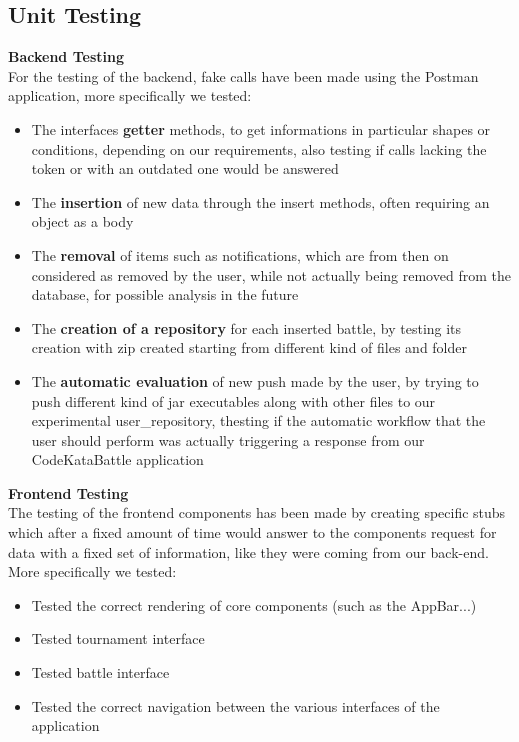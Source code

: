\documentclass[table, 12pt]{article}
\begin{document}
\subsection{Unit Testing}
\textbf{Backend Testing}\\
For the testing of the backend, fake calls have been made using the Postman application, more specifically we tested:
\begin{itemize}
    \item The interfaces \textbf{getter} methods, to get informations in particular shapes or conditions, depending on our requirements, also testing if calls lacking the token or with an outdated one would be answered
    \item The \textbf{insertion} of new data through the insert methods, often requiring an object as a body
    \item The \textbf{removal} of items such as notifications, which are from then on considered as removed by the user, while not actually being removed from the database, for possible analysis in the future
    \item The \textbf{creation of a repository} for each inserted battle, by testing its creation with zip created starting from different kind of files and folder
    \item The \textbf{automatic evaluation} of new push made by the user, by trying to push different kind of jar executables along with other files to our experimental user\_repository, thesting if the automatic workflow that the user should perform was actually triggering a response from our CodeKataBattle application
\end{itemize}
\textbf{Frontend Testing}\\
The testing of the frontend components has been made by creating specific stubs which after a fixed amount of time would answer to the components request for data with a fixed set of information, like they were coming from our back-end.\\
More specifically we tested:
\begin{itemize}
    \item Tested the correct rendering of core components (such as the AppBar...)
    \item Tested tournament interface 
    \item Tested battle interface
    \item Tested the correct navigation between the various interfaces of the application
\end{itemize}
\end{document}
